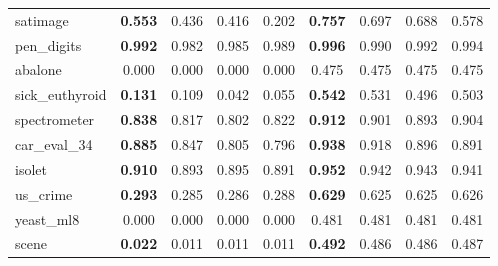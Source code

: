 \begin{figure}[ht]
\begin{tabular}{p{22mm}|*4{p{14mm}}|*4{p{14mm}}}
        satimage&\multicolumn{1}{c}{\textbf{0.553}}&\multicolumn{1}{c}{0.436}&\multicolumn{1}{c}{0.416}&\multicolumn{1}{c|}{0.202}&\multicolumn{1}{c}{\textbf{0.757}}&\multicolumn{1}{c}{0.697}&\multicolumn{1}{c}{0.688}&\multicolumn{1}{c}{0.578}\\
        pen\_digits&\multicolumn{1}{c}{\textbf{0.992}}&\multicolumn{1}{c}{0.982}&\multicolumn{1}{c}{0.985}&\multicolumn{1}{c|}{0.989}&\multicolumn{1}{c}{\textbf{0.996}}&\multicolumn{1}{c}{0.990}&\multicolumn{1}{c}{0.992}&\multicolumn{1}{c}{0.994}\\
        abalone&\multicolumn{1}{c}{0.000}&\multicolumn{1}{c}{0.000}&\multicolumn{1}{c}{0.000}&\multicolumn{1}{c|}{0.000}&\multicolumn{1}{c}{0.475}&\multicolumn{1}{c}{0.475}&\multicolumn{1}{c}{0.475}&\multicolumn{1}{c}{0.475}\\
        sick\_euthyroid&\multicolumn{1}{c}{\textbf{0.131}}&\multicolumn{1}{c}{0.109}&\multicolumn{1}{c}{0.042}&\multicolumn{1}{c|}{0.055}&\multicolumn{1}{c}{\textbf{0.542}}&\multicolumn{1}{c}{0.531}&\multicolumn{1}{c}{0.496}&\multicolumn{1}{c}{0.503}\\
        spectrometer&\multicolumn{1}{c}{\textbf{0.838}}&\multicolumn{1}{c}{0.817}&\multicolumn{1}{c}{0.802}&\multicolumn{1}{c|}{0.822}&\multicolumn{1}{c}{\textbf{0.912}}&\multicolumn{1}{c}{0.901}&\multicolumn{1}{c}{0.893}&\multicolumn{1}{c}{0.904}\\
        car\_eval\_34&\multicolumn{1}{c}{\textbf{0.885}}&\multicolumn{1}{c}{0.847}&\multicolumn{1}{c}{0.805}&\multicolumn{1}{c|}{0.796}&\multicolumn{1}{c}{\textbf{0.938}}&\multicolumn{1}{c}{0.918}&\multicolumn{1}{c}{0.896}&\multicolumn{1}{c}{0.891}\\
        isolet&\multicolumn{1}{c}{\textbf{0.910}}&\multicolumn{1}{c}{0.893}&\multicolumn{1}{c}{0.895}&\multicolumn{1}{c|}{0.891}&\multicolumn{1}{c}{\textbf{0.952}}&\multicolumn{1}{c}{0.942}&\multicolumn{1}{c}{0.943}&\multicolumn{1}{c}{0.941}\\
        us\_crime&\multicolumn{1}{c}{\textbf{0.293}}&\multicolumn{1}{c}{0.285}&\multicolumn{1}{c}{0.286}&\multicolumn{1}{c|}{0.288}&\multicolumn{1}{c}{\textbf{0.629}}&\multicolumn{1}{c}{0.625}&\multicolumn{1}{c}{0.625}&\multicolumn{1}{c}{0.626}\\
        yeast\_ml8&\multicolumn{1}{c}{0.000}&\multicolumn{1}{c}{0.000}&\multicolumn{1}{c}{0.000}&\multicolumn{1}{c|}{0.000}&\multicolumn{1}{c}{0.481}&\multicolumn{1}{c}{0.481}&\multicolumn{1}{c}{0.481}&\multicolumn{1}{c}{0.481}\\
        scene&\multicolumn{1}{c}{\textbf{0.022}}&\multicolumn{1}{c}{0.011}&\multicolumn{1}{c}{0.011}&\multicolumn{1}{c|}{0.011}&\multicolumn{1}{c}{\textbf{0.492}}&\multicolumn{1}{c}{0.486}&\multicolumn{1}{c}{0.486}&\multicolumn{1}{c}{0.487}\\

\end{tabular}
\end{figure}
